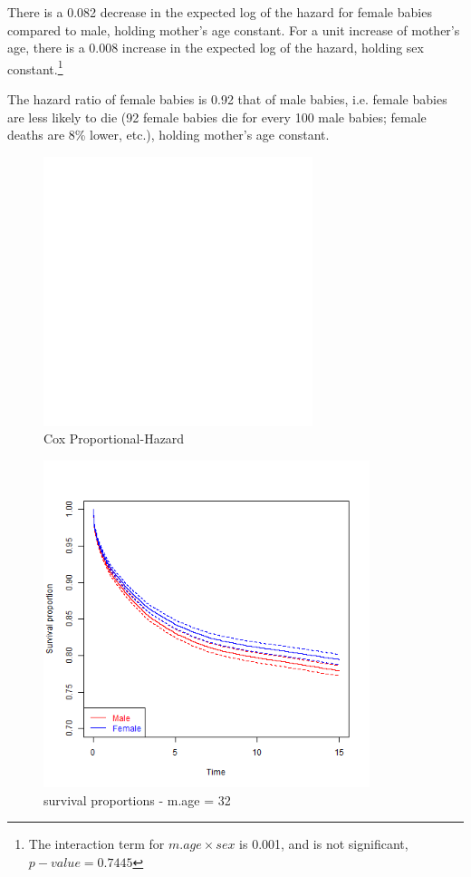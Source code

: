 \documentclass[12pt,letterpaper]{article}
\begin{document}
There is a 0.082 decrease in the expected log of the hazard for female babies compared to male, holding mother's age constant. For a unit increase of mother's age, there is a 0.008 increase in the expected log of the hazard, holding sex constant.\footnote{The interaction term for $m.age\times sex$ is 0.001, and is not significant, $p-value =0.7445$}

The hazard ratio of female babies is 0.92 that of male babies, i.e. female babies are less likely to die (92 female babies die for every 100 male babies; female deaths are 8\% lower, etc.), holding mother's age constant.  

  
  
\clearpage

  \begin{figure}[!htbp]
	  \includegraphics[width=0.7\textwidth,height=0.5\textheight]{graphics/coxreg.png}
	  \caption{Cox Proportional-Hazard}
	  \label{fig:cox}
	\end{figure}



  \begin{figure}[!htbp]
	  \includegraphics[width=0.85\textwidth]{graphics/surv_prop.png}
	  \caption{survival proportions - m.age = 32}
	  \label{fig:survprop}
	\end{figure}
\end{document}
